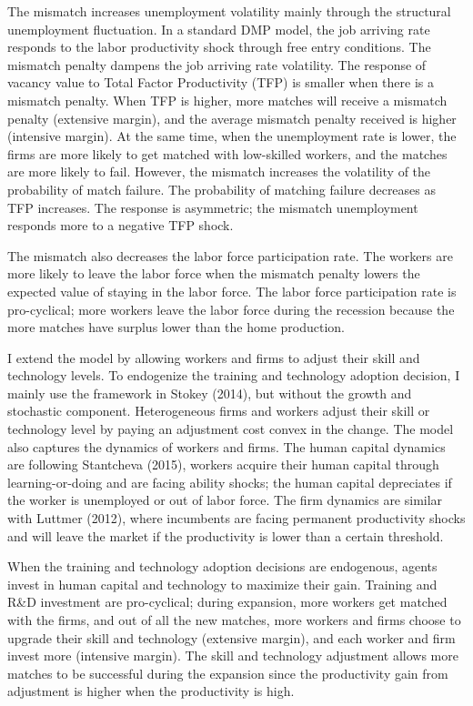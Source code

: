 \documentclass[12pt]{article}
\newcommand{\1}{\mathbb{1}}
\begin{document}
The mismatch increases unemployment volatility mainly through the structural unemployment fluctuation. In a standard DMP model, the job arriving rate responds to the labor productivity shock through free entry conditions. The mismatch penalty dampens the job arriving rate volatility. The response of vacancy value to Total Factor Productivity (TFP) is smaller when there is a mismatch penalty. When TFP is higher, more matches will receive a mismatch penalty (extensive margin), and the average mismatch penalty received is higher (intensive margin). At the same time, when the unemployment rate is lower, the firms are more likely to get matched with low-skilled workers, and the matches are more likely to fail. However, the mismatch increases the volatility of the probability of match failure. The probability of matching failure decreases as TFP increases. The response is asymmetric; the mismatch unemployment responds more to a negative TFP shock. 

The mismatch also decreases the labor force participation rate. The workers are more likely to leave the labor force when the mismatch penalty lowers the expected value of staying in the labor force. The labor force participation rate is pro-cyclical; more workers leave the labor force during the recession because the more matches have surplus lower than the home production. 

I extend the model by allowing workers and firms to adjust their skill and technology levels. To endogenize the training and technology adoption decision, I mainly use the framework in Stokey (2014)\nocite{Stokey2014}, but without the growth and stochastic component. Heterogeneous firms and workers adjust their skill or technology level by paying an adjustment cost convex in the change. The model also captures the dynamics of workers and firms. 
The human capital dynamics are following Stantcheva (2015)\nocite{Stantcheva2015}, workers acquire their human capital through learning-or-doing and are facing ability shocks; the human capital depreciates if the worker is unemployed or out of labor force. 
The firm dynamics are similar with Luttmer (2012)\nocite{Luttmer2012}, where incumbents are facing permanent productivity shocks and will leave the market if the productivity is lower than a certain threshold.  

When the training and technology adoption decisions are endogenous, agents invest in human capital and technology to maximize their gain. Training and R\&D investment are pro-cyclical; during expansion, more workers get matched with the firms, and out of all the new matches, more workers and firms choose to upgrade their skill and technology (extensive margin), and each worker and firm invest more (intensive margin). The skill and technology adjustment allows more matches to be successful during the expansion since the productivity gain from adjustment is higher when the productivity is high. 
\end{document}
